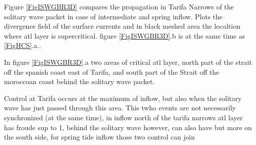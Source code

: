 Figure \ref{FigISWGBR3D} compares the propagation in Tarifa Narrows of the solitary wave packet in case of intermediate and spring inflow. Plots the divergence field of the surface currents and in black meshed area the localtion where atl layer is supercritical.  figure \ref{FigISWGBR3D}.b is at the same time as \ref{FigHCS}.a..

In figure \ref{FigISWGBR3D}.a two areas of critical atl layer, north part of the strait off the spanish coast east of Tarifa, and south part of the Strait off the moroccoan coast behind the solitary wave packet.

  


Control at Tarifa occurs at the maximum of inflow, but also when the solitary wave has just passed through this area. This twho events are not necessarily synchronized (at the same time), 
in inflow north of the tarifa narrows atl layer has froude sup to 1, behind the solitary wave however, can also have but more on the south side, for spring tide inflow those two control can join











